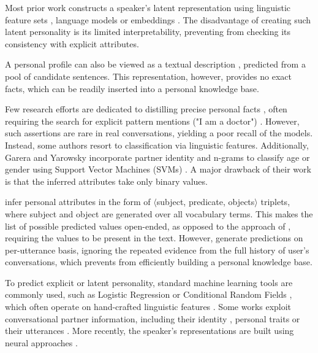 Most prior work constructs a speaker's latent representation using linguistic feature sets \cite{AIIDElin11, jing-kambhatla-roukos:2007:ACLMain, garera-yarowsky:2009:ACLIJCNLP}, language models \cite{song2019learning} or embeddings \cite{luo2019learning, li2016persona}. The disadvantage of creating such latent personality is its limited interpretability, preventing from checking its consistency with explicit attributes.

A personal profile can also be viewed as a textual description \cite{zhang2018personalizing}, predicted from a pool of candidate sentences. This representation, however, provides no exact facts, which can be readily inserted into a personal knowledge base.

Few research efforts are dedicated to distilling precise personal facts \cite{dial7, welch2019look, garera-yarowsky:2009:ACLIJCNLP}, often requiring the search for explicit pattern mentions ("I am a doctor") \cite{dial7}. However, such assertions are rare in real conversations, yielding a poor recall of the models. Instead, some authors resort to classification \cite{AIIDElin11, garera-yarowsky:2009:ACLIJCNLP} via linguistic features. Additionally, Garera and Yarowsky incorporate partner identity and n-grams to classify age or gender using Support Vector Machines (SVMs) \cite{garera-yarowsky:2009:ACLIJCNLP}. A major drawback of their work is that the inferred attributes take only binary values.

\citet{wu2019getting} infer personal attributes in the form of $\langle$subject, predicate, objects$\rangle$ triplets, where subject and object are generated over all vocabulary terms. This makes the list of possible predicted values open-ended, as opposed to the approach of \citet{dial7}, requiring the values to be present in the text. However, \citet{wu2019getting} generate predictions on per-utterance basis, ignoring the repeated evidence from the full history of user's conversations, which prevents from efficiently building a personal knowledge base.

To predict explicit or latent personality, standard machine learning tools are commonly used, such as Logistic Regression \cite{azab2019representing} or Conditional Random Fields \cite{li2016persona}, which often operate on hand-crafted linguistic features \cite{garera-yarowsky:2009:ACLIJCNLP}. Some works exploit conversational partner information, including their identity \cite{azab2019representing}, personal traits \cite{garera-yarowsky:2009:ACLIJCNLP} or their utterances \cite{welch2019look}. More recently, the speaker's representations are built using neural approaches \cite{zhang2018personalizing, pers2, luo2019learning, welch2019look}.


